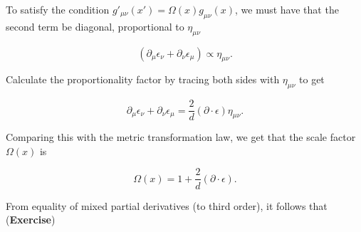 \documentclass[10pt]{article}
\begin{document}
\noindent To satisfy the condition $g'_{\mu\nu} (x') = \Omega(x) g_{\mu\nu} (x)$, we must have that the second term be diagonal, proportional to $\eta_{\mu\nu}$

\begin{equation}
(\partial_\mu \epsilon_\nu + \partial_\nu \epsilon_\mu) \propto \eta_{\mu\nu}.
\end{equation}

\noindent Calculate the proportionality factor by tracing both sides with $\eta_{\mu\nu}$ to get

\begin{equation}
\partial_\mu \epsilon_\nu + \partial_\nu \epsilon_\mu = \frac{2}{d} (\partial \cdot \epsilon) \eta_{\mu\nu}.
\end{equation}

\noindent Comparing this with the metric transformation law, we get that the scale factor $\Omega(x)$ is 

\begin{equation}
\Omega(x) = 1+\frac{2}{d} (\partial \cdot \epsilon).
\end{equation}

\noindent From equality of mixed partial derivatives (to third order), it follows that (\textbf{Exercise})

%

\end{document}
